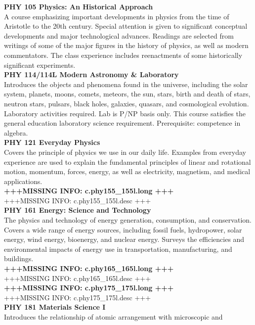 \documentclass[
  letterpaper,
]{scrbook}
\begin{document}
\textbf{PHY 105 Physics: An Historical Approach}\\
A course emphasizing important developments in physics from the time of
Aristotle to the 20th century. Special attention is given to significant
conceptual developments and major technological advances. Readings are
selected from writings of some of the major figures in the history of
physics, as well as modern commentators. The class experience includes
reenactments of some historically significant experiments.\\
\textbf{PHY 114/114L Modern Astronomy \& Laboratory}\\
Introduces the objects and phenomena found in the universe, including
the solar system, planets, moons, comets, meteors, the sun, stars, birth
and death of stars, neutron stars, pulsars, black holes, galaxies,
quasars, and cosmological evolution. Laboratory activities required. Lab
is P/NP basis only. This course satisfies the general education
laboratory science requirement. Prerequisite: competence in algebra.\\
\textbf{PHY 121 Everyday Physics}\\
Covers the principle of physics we use in our daily life. Examples from
everyday experience are used to explain the fundamental principles of
linear and rotational motion, momentum, forces, energy, as well as
electricity, magnetism, and medical applications.\\
\textbf{+++MISSING INFO: c.phy155\_155l.long +++}\\
+++MISSING INFO: c.phy155\_155l.desc +++\\
\textbf{PHY 161 Energy: Science and Technology}\\
The physics and technology of energy generation, consumption, and
conservation. Covers a wide range of energy sources, including fossil
fuels, hydropower, solar energy, wind energy, bioenergy, and nuclear
energy. Surveys the efficiencies and environmental impacts of energy use
in transportation, manufacturing, and buildings.\\
\textbf{+++MISSING INFO: c.phy165\_165l.long +++}\\
+++MISSING INFO: c.phy165\_165l.desc +++\\
\textbf{+++MISSING INFO: c.phy175\_175l.long +++}\\
+++MISSING INFO: c.phy175\_175l.desc +++\\
\textbf{PHY 181 Materials Science I}\\
Introduces the relationship of atomic arrangement with microscopic and
\end{document}
